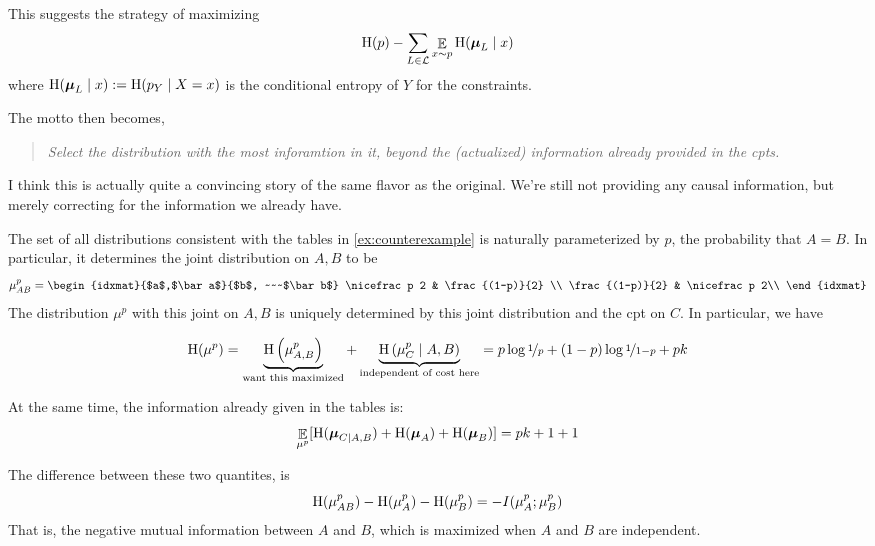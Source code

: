 \documentclass{article}
\def\nf{\nicefrac}
\begin{document}
	This suggests the strategy of maximizing 
	\[ \mathrm{H} (p) - \sum_{L \in \mathcal L} \mathop{\mathbb E}_{x \sim p}  \mathrm{H}(\boldsymbol\mu_L \mid x)   \]
	where $\mathrm{H}(\boldsymbol\mu_L \mid x) := \mathrm{H}(p_Y \mid X = x)$ is the conditional entropy of $Y$ for the constraints. 
	
	The motto then becomes, 
	
	\begin{quote}
	\textit{Select the distribution with the most inforamtion in it, beyond the (actualized) information already provided in the cpts.}	
	\end{quote}
	
	I think this is actually quite a convincing story of the same flavor as the original. We're still not providing any causal information, but merely correcting for the information we already have. 
	
	\begin{example}[continues=ex:counterexample]
		The set of all distributions consistent with the tables in \cref{ex:counterexample} is naturally parameterized by $p$, the probability that $A = B$. In particular, it determines the joint distribution on $A,B$ to be
		\[ \mu_{AB}^{p} = \begin{idxmat}{$a$,$\bar a$}{$b$,  ~~~$\bar b$}
				\nf p 2 & \frac{(1-p)}{2} \\
				\frac {(1-p)}{2} & \nf p 2\\
			\end{idxmat}
		\]
		The distribution $\mu^{p}$ with this joint on $A, B$ is uniquely determined by this joint distribution and the cpt on $C$. In particular, we have 
		
		\[ \H(\mu^{p}) = \underbrace{\H\left(\mu^{p}_{A,B}\right)}_{\text{want this maximized}} + \underbrace{\H\left(\mu^{p}_{C }\mid A,B\right)}_{\text{independent of cost here}}
		 	= p \log \nf1p + (1-p) \log \nf1{1-p} + pk\]
			
		At the same time, the information already given in the tables is:
		\[ \mathop{\mathbb E}_{\mu^{p}} [ \mathrm{H}(\boldsymbol\mu_{C\mid A,B}) + \mathrm{H}(\boldsymbol\mu_{A}) + \mathrm{H}(\boldsymbol\mu_{B}) ]
		 = pk + 1 + 1 \]
		 
		 The difference between these two quantites, is 
		 \[ \mathrm{H}(\mu_{AB}^{p}) - \mathrm{H}(\mu^{p}_A) - \mathrm{H}(\mu^{p}_B) = -I(\mu^p_A ; \mu^p_B) \]
		 That is, the negative mutual information between $A$ and $B$, which is maximized when $A$ and $B$ are independent.
	\end{example}
	
\end{document}
